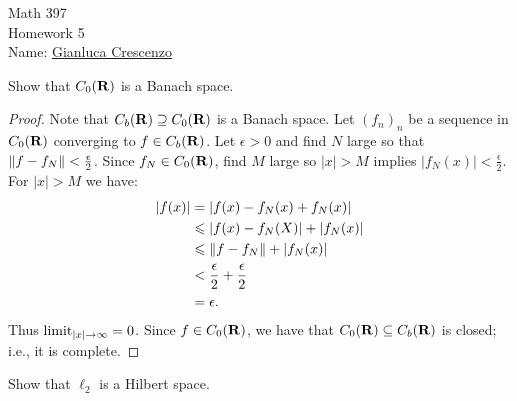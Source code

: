 \documentclass[11pt,twoside,openany]{memoir}
\begin{document}
\begin{center}
{\large Math 397 \\[0.1in]Homework 5 \\[0.1in]}
{Name:} {\underline{Gianluca Crescenzo\hspace*{2in}}}\\[0.15in]
\end{center}
\vspace{4pt}
    \begin{exercise}
        Show that $C_0(\mathbf{R})$ is a Banach space.
    \end{exercise}
        \begin{proof}
            Note that $C_b(\mathbf{R}) \supseteq C_0(\mathbf{R})$ is a Banach space. Let $(f_n)_n$ be a sequence in $C_0(\mathbf{R})$ converging to $f \in C_b(\mathbf{R})$. Let $\epsilon > 0$ and find $N$ large so that $\left\lVert f - f_N \right\rVert < \frac{\epsilon}{2}$. Since $f_N \in C_0(\mathbf{R})$, find $M$ large so $|x| > M$ implies $|f_N(x)| < \frac{\epsilon}{2}$. For $|x| > M$ we have:
                \begin{equation*}
                \begin{split}
                    |f(x)|
                    & = |f(x) - f_N(x) + f_N(x)| \\
                    & \leqslant |f(x) - f_N(X)| + |f_N(x)| \\
                    & \leqslant \left\lVert f - f_N \right\rVert + |f_N(x)| \\
                    & < \frac{\epsilon}{2} + \frac{\epsilon}{2} \\
                    & = \epsilon.
                \end{split}
                \end{equation*}
            Thus $\operatorname*{limit}_{|x| \rightarrow \infty} = 0$. Since $f \in C_0(\mathbf{R})$, we have that $C_0(\mathbf{R}) \subseteq C_b(\mathbf{R})$ is closed; i.e., it is complete.
        \end{proof}
    \begin{exercise}
        Show that $\ell_2$ is a Hilbert space.
    \end{exercise}
\end{document}
